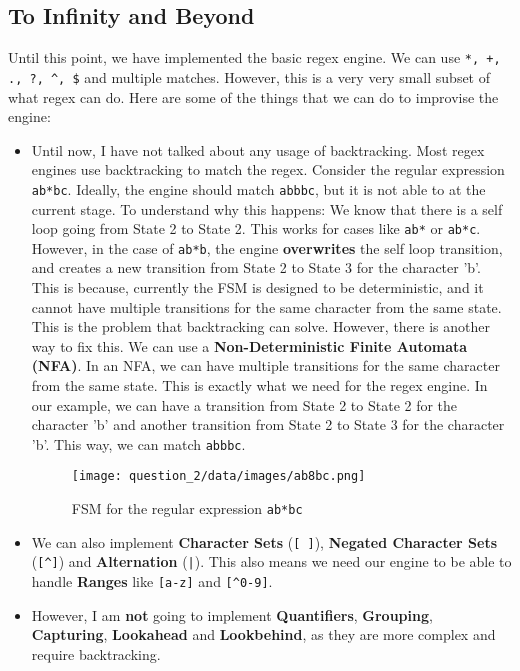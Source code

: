 \documentclass[12pt]{report}
\begin{document}
\subsection{To Infinity and Beyond}

Until this point, we have implemented the basic regex engine. We can use
\texttt{*, +, ., ?, \textasciicircum, \$} and multiple matches. However, this is a very very small subset of what regex can do. Here are some of the things that we can do to improvise the engine:

\begin{itemize}
    \item Until now, I have not talked about any usage of backtracking. Most regex engines use backtracking to match the regex. Consider the regular expression \texttt{ab*bc}. Ideally, the engine should match \texttt{abbbc}, but it is not able to at the current stage. To understand why this happens: We know that there is a self loop going from State 2 to State 2. This works for cases like \texttt{ab*} or \texttt{ab*c}. However, in the case of \texttt{ab*b}, the engine \textbf{overwrites} the self loop transition, and creates a new transition from State 2 to State 3 for the character 'b'. This is because, currently the FSM is designed to be deterministic, and it cannot have multiple transitions for the same character from the same state. This is the problem that backtracking can solve. However, there is another way to fix this. We can use a \textbf{Non-Deterministic Finite Automata (NFA)}. In an NFA, we can have multiple transitions for the same character from the same state. This is exactly what we need for the regex engine. In our example, we can have a transition from State 2 to State 2 for the character 'b' and another transition from State 2 to State 3 for the character 'b'. This way, we can match \texttt{abbbc}.

          \begin{figure}[H]
              \centering
              \texttt{[image: question\_2/data/images/ab8bc.png]}
              \caption{FSM for the regular expression \texttt{ab*bc}}
          \end{figure}

    \item We can also implement \textbf{Character Sets} (\texttt{[ ]}), \textbf{Negated Character Sets} (\texttt{[\textasciicircum ]}) and \textbf{Alternation} (\texttt{|}). This also means we need our engine to be able to handle \textbf{Ranges} like \texttt{[a-z]} and \texttt{[\textasciicircum0-9]}.
    \item However, I am \textbf{not} going to implement \textbf{Quantifiers}, \textbf{Grouping}, \textbf{Capturing}, \textbf{Lookahead} and \textbf{Lookbehind}, as they are more complex and require backtracking.
\end{itemize}
\end{document}
